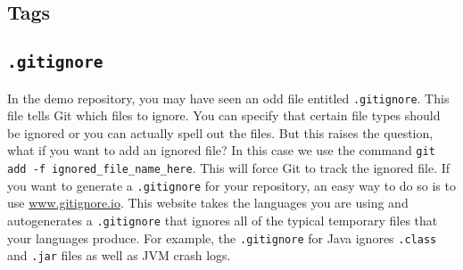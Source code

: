 \documentclass[notitlepage]{simple}
\begin{document}
\subsection{Tags}

\subsection{\texttt{.gitignore}}

In the demo repository, you may have seen an odd file entitled \verb|.gitignore|.
This file tells Git which files to ignore.
You can specify that certain file types should be ignored or you can actually spell out the files.
But this raises the question, what if you want to add an ignored file?
In this case we use the command \verb|git add -f ignored_file_name_here|.
This will force Git to track the ignored file.
If you want to generate a \verb|.gitignore| for your repository, an easy way to do so is to use \url{www.gitignore.io}.
This website takes the languages you are using and autogenerates a \verb|.gitignore| that ignores all of the typical temporary files that your languages produce.
For example, the \verb|.gitignore| for Java ignores \verb|.class| and \verb|.jar| files as well as JVM crash logs.
\end{document}
